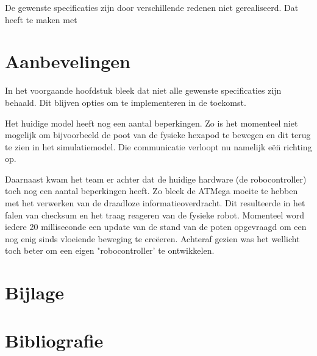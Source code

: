 \documentclass[10pt,a4paper]{article}
\begin{document}
De gewenste specificaties zijn door verschillende redenen niet gerealiseerd. Dat heeft te maken met 

\newpage
\section{Aanbevelingen}
In het voorgaande hoofdstuk bleek dat niet alle gewenste specificaties zijn behaald. Dit blijven opties om te implementeren in de toekomst. 

Het huidige model heeft nog een aantal beperkingen. Zo is het momenteel niet mogelijk om bijvoorbeeld de poot van de fysieke hexapod te bewegen en dit terug te zien in het simulatiemodel. Die communicatie verloopt nu namelijk e\"e\"n richting op. 

Daarnaast kwam het team er achter dat de huidige hardware (de robocontroller) toch nog een aantal beperkingen heeft. Zo bleek de ATMega moeite te hebben met het verwerken van de draadloze informatieoverdracht. Dit resulteerde in het falen van checksum en het traag reageren van de fysieke robot. Momenteel word iedere 20 milliseconde een update van de stand van de poten opgevraagd om een nog enig sinds vloeiende beweging te cre\"eeren. Achteraf gezien was het wellicht toch beter om een eigen "robocontroller' te ontwikkelen.


\newpage


\section{Bijlage}

\newpage

\section{Bibliografie}


\end{document}
